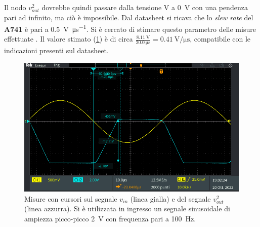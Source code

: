 Il nodo $v_{out}^2$ dovrebbe quindi passare dalla tensione V a \SI{0}{\volt} con una pendenza pari ad infinito, ma ciò è impossibile. Dal datasheet si ricava che lo \textit{slew rate} del \textbf{\textmu A741} è pari a \SI{0.5}{\volt\per\micro\second}. Si è cercato di stimare questo parametro delle misure effettuate . Il valore stimato (\Fig\ref{fig:slew_rate_circuito_1}) è di circa $\frac{\SI{8.11}{\volt}}{\SI{20.0}{\micro\second}}=\SI{0.41}{\volt\per\micro\second}$, compatibile con le indicazioni presenti sul datasheet.
\begin{figure}[h]
	\centering
	\includegraphics[width=\linewidth]{./ImageFiles/Laboratorio 3/TEK00006.PNG}
	\caption{Misure con cursori sul segnale $v_{in}$ (linea gialla) e del segnale $v_{out}^2$ (linea azzurra). Si è utilizzata in ingresso un segnale sinusoidale di ampiezza picco-picco \SI{2}{\volt} con frequenza pari a \SI{100}{\hertz}.}
	\label{fig:slew_rate_circuito_1}
\end{figure}

